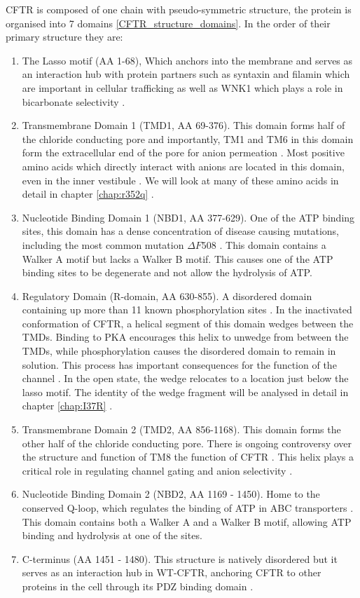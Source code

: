 CFTR is composed of one chain with pseudo-symmetric structure, the protein is organised into 7 domains \ref{CFTR_structure_domains}. In the order of their primary structure they are: 
\begin{enumerate}
	\item The Lasso motif (AA 1-68), Which anchors into the membrane and serves as an interaction hub with protein partners such as syntaxin and filamin which are important in cellular trafficking \cite{cormet-boyaka2002, naren1998, thelin2007} as well as WNK1 which plays a role in bicarbonate selectivity \cite{kim2019}. 
	\item Transmembrane Domain 1 (TMD1, AA 69-376). This domain forms half of the chloride conducting pore and importantly, TM1 and TM6 in this domain form the extracellular end of the pore for anion permeation \cite{linsdell2006, linsdell2022}. Most positive amino acids which directly interact with anions are located in this domain, even in the inner vestibule \cite{linsdell2018}. We will look at many of these amino acids in detail in chapter \ref{chap:r352q} \cite{wong2022a}. 
	\item Nucleotide Binding Domain 1 (NBD1, AA 377-629). One of the ATP binding sites, this domain has a dense concentration of disease causing mutations, including the most common mutation $\Delta F508$ \cite{cftr2}. This domain contains a Walker A motif but lacks a Walker B motif. This causes one of the ATP binding sites to be degenerate and not allow the hydrolysis of ATP. 

	\item Regulatory Domain (R-domain, AA 630-855). A disordered domain containing up more than 11 known phosphorylation sites \cite{mihalyi2020}. In the inactivated conformation of CFTR, a helical segment of this domain wedges between the TMDs. Binding to PKA encourages this helix to unwedge from between the TMDs, while phosphorylation causes the disordered domain to remain in solution. This process has important consequences for the function of the channel \cite{ostedgaard2000, mihalyi2020}. In the open state, the wedge relocates to a location just below the lasso motif. The identity of the wedge fragment will be analysed in detail in chapter \ref{chap:I37R} \cite{wong2022}. 

	\item Transmembrane Domain 2 (TMD2, AA 856-1168). This domain forms the other half of the chloride conducting pore. There is ongoing controversy over the structure and function of TM8 the function of CFTR \cite{hegedus2022, liu2019}. This helix plays a critical role in regulating channel gating and anion selectivity \cite{negoda2019}.
	\item Nucleotide Binding Domain 2 (NBD2, AA 1169 - 1450). Home to the conserved Q-loop, which regulates the binding of ATP in ABC transporters \cite{ivey2020, zolnerciks2014, dong2015}. This domain contains both a Walker A and a Walker B motif, allowing ATP binding and hydrolysis at one of the sites. 
	\item C-terminus (AA 1451 - 1480). This structure is natively disordered but it serves as an interaction hub in WT-CFTR, anchoring CFTR to other proteins in the cell through its PDZ binding domain \cite{moyer1999, cushing2008}. 


\end{enumerate}
